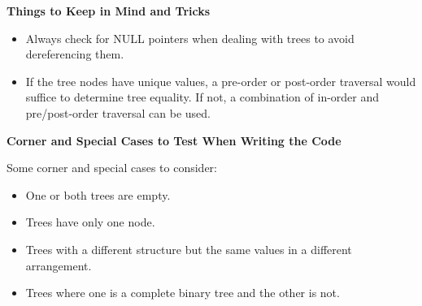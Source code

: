 \textbf{Things to Keep in Mind and Tricks}

\begin{itemize}
    \item Always check for NULL pointers when dealing with trees to avoid dereferencing them.
    \item If the tree nodes have unique values, a pre-order or post-order traversal would suffice to determine tree equality. If not, a combination of in-order and pre/post-order traversal can be used.
\end{itemize}

\textbf{Corner and Special Cases to Test When Writing the Code}

Some corner and special cases to consider:
\begin{itemize}
    \item One or both trees are empty.
    \item Trees have only one node.
    \item Trees with a different structure but the same values in a different arrangement.
    \item Trees where one is a complete binary tree and the other is not.
\end{itemize}